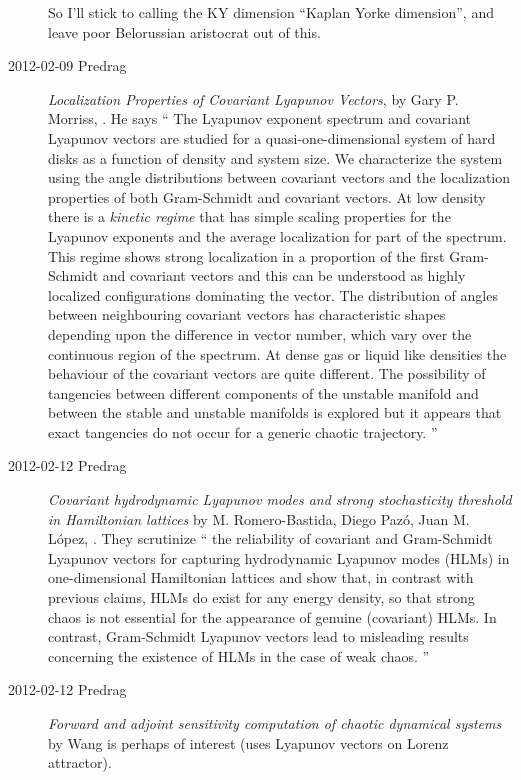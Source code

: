 \begin{description}
So I'll stick to calling the KY dimension  ``Kaplan Yorke dimension'', and
leave poor Belorussian aristocrat out of this.


\item[2012-02-09 Predrag]
{\em Localization Properties of Covariant {Lyapunov} Vectors},
by Gary P. Morriss,
. He says
``
    The Lyapunov exponent spectrum and covariant Lyapunov vectors are studied for
a quasi-one-dimensional system of hard disks as a function of density and
system size. We characterize the system using the angle distributions between
covariant vectors and the localization properties of both Gram-Schmidt and
covariant vectors. At low density there is a {\it kinetic regime} that has
simple scaling properties for the Lyapunov exponents and the average
localization for part of the spectrum. This regime shows strong localization in
a proportion of the first Gram-Schmidt and covariant vectors and this can be
understood as highly localized configurations dominating the vector. The
distribution of angles between neighbouring covariant vectors has
characteristic shapes depending upon the difference in vector number, which
vary over the continuous region of the spectrum. At dense gas or liquid like
densities the behaviour of the covariant vectors are quite different. The
possibility of tangencies between different components of the unstable manifold
and between the stable and unstable manifolds is explored but it appears that
exact tangencies do not occur for a generic chaotic trajectory.
''

\item[2012-02-12 Predrag]
{\em Covariant hydrodynamic Lyapunov modes and strong stochasticity threshold
 in Hamiltonian lattices}
by M. Romero-Bastida, Diego Paz\'o, Juan M. L\'opez, . They scrutinize
``
the reliability of covariant and Gram-Schmidt Lyapunov vectors
for capturing hydrodynamic Lyapunov modes (HLMs) in one-dimensional Hamiltonian
lattices and show that, in contrast with previous claims, HLMs do exist for any
energy density, so that strong chaos is not essential for the appearance of
genuine (covariant) HLMs. In contrast, Gram-Schmidt Lyapunov vectors lead to
misleading results concerning the existence of HLMs in the case of weak chaos.
''

\item[2012-02-12 Predrag]
{\em Forward and adjoint sensitivity computation of chaotic dynamical
systems} by Wang is perhaps of interest (uses Lyapunov vectors
on Lorenz attractor).


\end{description}
